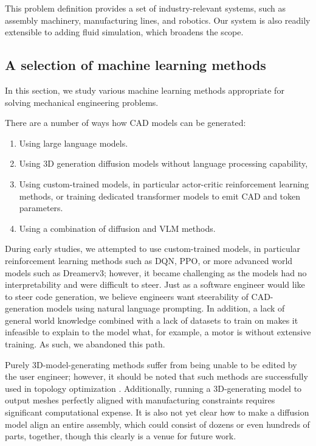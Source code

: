 \documentclass[conference]{IEEEtran}
\begin{document}
This problem definition provides a set of industry-relevant systems, such as assembly machinery, manufacturing lines, and robotics. Our system is also readily extensible to adding fluid simulation, which broadens the scope.

\subsection{A selection of machine learning methods}
In this section, we study various machine learning methods appropriate for solving mechanical engineering problems.

There are a number of ways how CAD models can be generated:

\begin{enumerate}
    \item Using large language models.
    \item Using 3D generation diffusion models without language processing capability,
    \item Using custom-trained models, in particular actor-critic reinforcement learning methods, or training dedicated transformer models to emit CAD and token parameters.
    \item Using a combination of diffusion and VLM methods.
\end{enumerate}

During early studies, we attempted to use custom-trained models, in particular reinforcement learning methods such as DQN, PPO, or more advanced world models such as Dreamerv3; however, it became challenging as the models had no interpretability and were difficult to steer. Just as a software engineer would like to steer code generation, we believe engineers want steerability of CAD-generation models using natural language prompting. In addition, a lack of general world knowledge combined with a lack of datasets to train on makes it infeasible to explain to the model what, for example, a motor is without extensive training. As such, we abandoned this path.

Purely 3D-model-generating methods \cite{ref38} suffer from being unable to be edited by the user engineer; however, it should be noted that such methods are successfully used in topology optimization \cite{ref11}. Additionally, running a 3D-generating model to output meshes perfectly aligned with manufacturing constraints requires significant computational expense. It is also not yet clear how to make a diffusion model align an entire assembly, which could consist of dozens or even hundreds of parts, together, though this clearly is a venue for future work.
\end{document}
